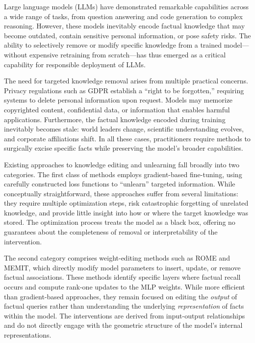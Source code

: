 \label{sec:introduction}

Large language models (LLMs) have demonstrated remarkable capabilities across a wide range of tasks, from question answering and code generation to complex reasoning. However, these models inevitably encode factual knowledge that may become outdated, contain sensitive personal information, or pose safety risks. The ability to selectively remove or modify specific knowledge from a trained model---without expensive retraining from scratch---has thus emerged as a critical capability for responsible deployment of LLMs.

The need for targeted knowledge removal arises from multiple practical concerns. Privacy regulations such as GDPR establish a ``right to be forgotten,'' requiring systems to delete personal information upon request. Models may memorize copyrighted content, confidential data, or information that enables harmful applications. Furthermore, the factual knowledge encoded during training inevitably becomes stale: world leaders change, scientific understanding evolves, and corporate affiliations shift. In all these cases, practitioners require methods to surgically excise specific facts while preserving the model's broader capabilities.

Existing approaches to knowledge editing and unlearning fall broadly into two categories. The first class of methods employs gradient-based fine-tuning, using carefully constructed loss functions to ``unlearn'' targeted information. While conceptually straightforward, these approaches suffer from several limitations: they require multiple optimization steps, risk catastrophic forgetting of unrelated knowledge, and provide little insight into how or where the target knowledge was stored. The optimization process treats the model as a black box, offering no guarantees about the completeness of removal or interpretability of the intervention.

The second category comprises weight-editing methods such as ROME and MEMIT, which directly modify model parameters to insert, update, or remove factual associations. These methods identify specific layers where factual recall occurs and compute rank-one updates to the MLP weights. While more efficient than gradient-based approaches, they remain focused on editing the \emph{output} of factual queries rather than understanding the underlying \emph{representation} of facts within the model. The interventions are derived from input-output relationships and do not directly engage with the geometric structure of the model's internal representations.

